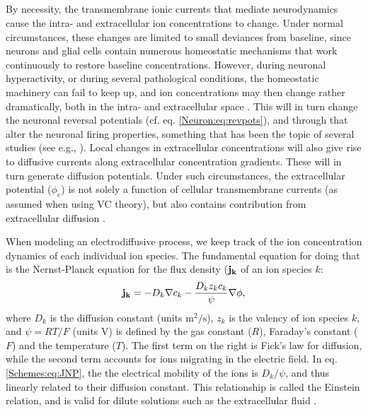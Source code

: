 \subsection{}
\label{sec:Schemes:complete}
 
By necessity, the transmembrane ionic currents that mediate neurodynamics cause the intra- and extracellular ion concentrations to change. Under normal circumstances, these changes are limited to small deviances from baseline, since neurons and glial cells contain numerous homeostatic mechanisms that work continuously to restore baseline concentrations. However, during neuronal hyperactivity, or during several pathological conditions, the homeostatic machinery can fail to keep up, and ion concentrations may then change rather dramatically, both in the intra- and extracellular space \citep{Dietzel1989, Somjen2001, Frohlich2008, Zandt2015, Ayata2015}. This will in turn change the neuronal reversal potentials (cf. eq. \ref{Neuron:eq:revpots}), and through that alter the neuronal firing properties, something that has been the topic of several studies (see e.g., \citep{Qian1989, Cressman2009, Zandt2011, Oyehaug2012, WeiUllahSchiff2014, Saetra2020}). Local changes in extracellular concentrations will also give rise to diffusive currents along extracellular concentration gradients. These will in turn generate diffusion potentials. Under such circumstances, the extracellular potential ($\phi_e$) is not solely a function of cellular transmembrane currents (as assumed when using VC theory), but also contains contribution from extracellular diffusion \citep{Halnes2016}. 

When modeling an electrodiffusive process, we keep track of the ion concentration dynamics of each individual ion species. The fundamental equation for doing that is the Nernst-Planck equation for the flux density (${\bf j_k}$ of an ion species $k$:
\begin{equation}
{\bf j_k} = - D_k {\bf \nabla} c_{k} - \frac{D_k z_k c_k}{\psi} {\bf \nabla} \phi, 
\label{Schemes:eq:JNP}
\end{equation}
where ${D}_k$ is the diffusion constant (units $\mathrm{m^2/s}$), $z_{k}$ is the valency of ion species $k$, and $\psi=RT/F$ (units V) is defined by the gas constant ($R$), Faraday's constant ($F$) and the temperature ($T$). The first term on the right is Fick's law for diffusion, while the second term accounts for ions migrating in the electric field.  In eq. \ref{Schemes:eq:JNP}, the the electrical mobility of the ions is $D_k/\psi$, and thus linearly related to their diffusion constant. This relationship is called the Einstein relation, and is valid for dilute solutions such as the extracellular fluid \citep{Grodzinsky2011}.

